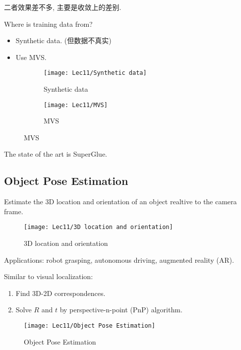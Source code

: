 \begin{enumerate}
    二者效果差不多, 主要是收敛上的差别. 

    Where is training data from? 
    \begin{itemize}
        \item Synthetic data. (但数据不真实)
        \item Use MVS. 
    \end{itemize}
    \begin{figure}[H]
        \centering
        \begin{subfigure}{0.5\textwidth}
            \centering
            \texttt{[image: Lec11/Synthetic data]}
            \caption{Synthetic data}
        \end{subfigure}
        \begin{subfigure}{0.3\textwidth}
            \centering
            \texttt{[image: Lec11/MVS]}
            \caption{MVS}
        \end{subfigure}
    \end{figure}
\end{enumerate}

The state of the art is SuperGlue. 

\subsection{Object Pose Estimation}
Estimate the 3D location and orientation of an object realtive to the camera frame. 

\begin{figure}[H]
    \centering
    \texttt{[image: Lec11/3D location and orientation]}
    \caption{3D location and orientation}
\end{figure}

Applications: robot grasping, autonomous driving, augmented reality (AR). 

Similar to visual localization:
\begin{enumerate}
    \item Find 3D-2D correspondences. 
    \item Solve $R$ and $t$ by perspective-n-point (PnP) algorithm. 
\end{enumerate}
\begin{figure}[H]
    \centering
    \texttt{[image: Lec11/Object Pose Estimation]}
    \caption{Object Pose Estimation}
\end{figure}


